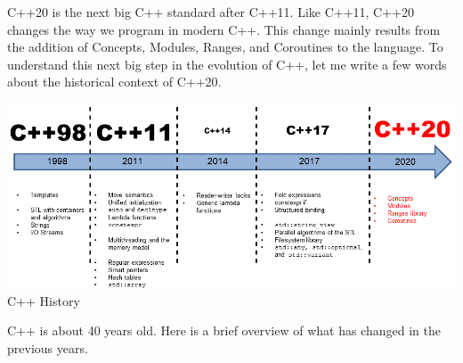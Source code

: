 
C++20 is the next big C++ standard after C++11. Like C++11, C++20 changes the way we program in modern C++. This change mainly results from the addition of Concepts, Modules, Ranges, and Coroutines to the language. To understand this next big step in the evolution of C++, let me write a few words about the historical context of C++20.

\begin{center}
\includegraphics[width=1.0\textwidth]{content/1/chapter1/images/1.png}\\
C++ History
\end{center}

C++ is about 40 years old. Here is a brief overview of what has changed in the previous years.





























